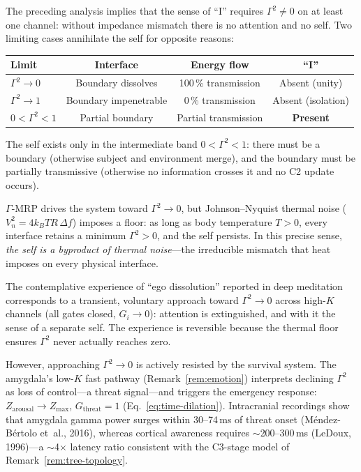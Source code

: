 \documentclass[aps,pre,twocolumn,superscriptaddress,floatfix]{revtex4-2}
\begin{document}
\begin{remark}
\label{rem:self-thermal}
The preceding analysis implies that the sense of ``I''
requires $\Gamma^2 \neq 0$ on at least one channel:
without impedance mismatch there is no attention and
no self.
Two limiting cases annihilate the self for opposite
reasons:

\begin{center}
\begin{tabular}{lccc}
\toprule
Limit & Interface & Energy flow & ``I'' \\
\midrule
$\Gamma^2 \to 0$ &
  Boundary dissolves & 100\,\% transmission &
  Absent (unity) \\
$\Gamma^2 \to 1$ &
  Boundary impenetrable & 0\,\% transmission &
  Absent (isolation) \\
$0 < \Gamma^2 < 1$ &
  Partial boundary & Partial transmission &
  \textbf{Present} \\
\bottomrule
\end{tabular}
\end{center}

\noindent
The self exists only in the intermediate band
$0 < \Gamma^2 < 1$: there must be a boundary
(otherwise subject and environment merge), and the
boundary must be partially transmissive
(otherwise no information crosses it and no C2
update occurs).

$\Gamma$-MRP drives the system toward $\Gamma^2 \to 0$,
but Johnson--Nyquist thermal noise
($V_n^2 = 4k_B T R\,\Delta f$) imposes a floor:
as long as body temperature $T > 0$, every interface
retains a minimum $\Gamma^2 > 0$, and the self
persists.
In this precise sense,
\emph{the self is a byproduct of thermal noise}---the
irreducible mismatch that heat imposes on every
physical interface.

The contemplative experience of ``ego dissolution''
reported in deep meditation corresponds to a
transient, voluntary approach toward $\Gamma^2 \to 0$
across high-$K$ channels (all gates closed,
$G_i \to 0$): attention is extinguished, and with it
the sense of a separate self.
The experience is reversible because the thermal floor
ensures $\Gamma^2$ never actually reaches zero.

However, approaching $\Gamma^2 \to 0$ is actively
resisted by the survival system.
The amygdala's low-$K$ fast pathway
(Remark~\ref{rem:emotion}) interprets declining
$\Gamma^2$ as loss of control---a threat signal---and
triggers the emergency response:
$Z_{\text{arousal}} \to Z_{\max}$,
$G_{\text{threat}} = 1$
(Eq.~\ref{eq:time-dilation}).
Intracranial recordings show that amygdala gamma
power surges within 30--74\,ms of threat onset
(M\'{e}ndez-B\'{e}rtolo et~al., 2016), whereas
cortical awareness requires $\sim$200--300\,ms
(LeDoux, 1996)---a $\sim$4$\times$ latency ratio
consistent with the C3-stage model of
Remark~\ref{rem:tree-topology}.


\end{remark}
\end{document}
